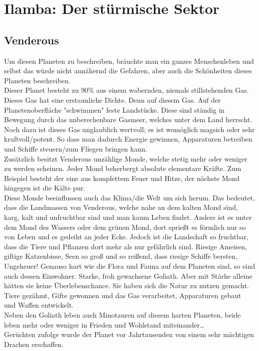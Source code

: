 \documentclass{book}
\begin{document}
\chapter{Ilamba: Der stürmische Sektor}

\section{Venderous}
Um diesen Planeten zu beschreiben, bräuchte man ein ganzes Menschenleben und selbst das würde nicht annähernd die Gefahren, aber auch die Schönheiten dieses Planeten beschreiben.\\
Dieser Planet besteht zu 90\% aus einem wabernden, niemals stillstehenden Gas. Dieses Gas hat eine erstaunliche Dichte. Denn auf diesem Gas. Auf der Planetenoberfläche "schwimmen" feste Landstücke. Diese sind ständig in Bewegung durch das unberechenbare Gasmeer, welches unter dem Land herrscht. Noch dazu ist dieses Gas unglaublich wertvoll; es ist womöglich magsich oder sehr kraftvoll/potent. So dass man dadurch Energie gewinnen, Apparaturen betreiben und Schiffe steuern/zum Fliegen bringen kann.\\
Zusätzlich besitzt Venderous unzählige Monde, welche stetig mehr oder weniger zu werden scheinen. Jeder Mond beherbergt absolute elementare Kräfte. Zum Beispiel besteht der eine aus komplettem Feuer und Hitze, der nächste Mond hingegen ist die Kälte pur.\\
Diese Monde beeinflussen auch das Klima/die Welt um sich herum. Das bedeutet, dass die Landmassen von Venderous, welche nahe an dem kalten Mond sind, karg, kalt und unfruchtbar sind und man kaum Leben findet. Anders ist es unter dem Mond des Wassers oder dem grünen Mond, dort sprießt es förmlich nur so von Leben und es gedeiht an jeder Ecke. Jedoch ist die Landschaft so fruchtbar, dass die Tiere und Pflanzen dort mehr als nur gefährlich sind. Riesige Ameisen, giftige Katzenbisse, Seen so groß und so reißend, dass riesige Schiffe bersten, Ungeheuer!
Genauso hart wie die Flora und Fauna auf dem Planeten sind, so sind auch dessen Einwohner. Starke, froh gewachsene Goliath. Aber mit Stärke alleine hätten sie keine Überlebenschance. Sie haben sich die Natur zu nutzen gemacht. Tiere gezähmt, Gifte gewonnen und das Gas verarbeitet, Apparaturen gebaut und Waffen entwickelt.\\
Neben den Goliath leben auch Minotauren auf diesem harten Planeten, beide leben mehr oder weniger in Frieden und Wohlstand miteinander\dots\\
Gerüchten zufolge wurde der Planet vor Jahrtausenden von einem sehr mächtigen Drachen erschaffen. 
\end{document}
